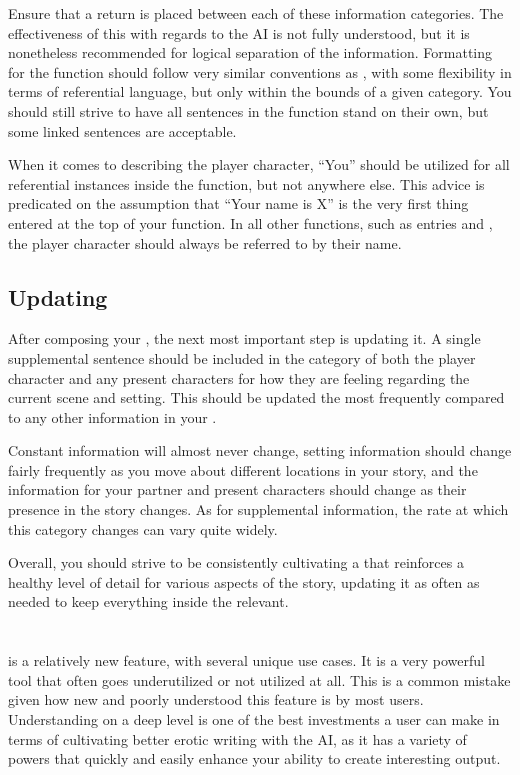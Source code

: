 \documentclass[Source-main.tex]{subfiles}
\begin{document}
Ensure that a return is placed between each of these information categories.
The effectiveness of this with regards to the AI is not fully understood, but it is nonetheless recommended for logical separation of the information.
Formatting for the \rem function should follow very similar conventions as \wi, with some flexibility in terms of referential language, but only within the bounds of a given category.
You should still strive to have all sentences in the \rem function stand on their own, but some linked sentences are acceptable.

When it comes to describing the player character, “You” should be utilized for all referential instances inside the \rem function, but not anywhere else.
This advice is predicated on the assumption that “Your name is X” is the very first thing entered at the top of your \rem function.
In all other functions, such as \wi entries and \an, the player character should always be referred to by their name.

\section{Updating}
\label{sec:updating}

After composing your \rem, the next most important step is updating it.
A single supplemental sentence should be included in the category of both the player character and any present characters for how they are feeling regarding the current scene and setting.
This should be updated the most frequently compared to any other information in your \rem.

Constant information will almost never change, setting information should change fairly frequently as you move about different locations in your story, and the information for your partner and present characters should change as their presence in the story changes.
As for supplemental information, the rate at which this category changes can vary quite widely.

Overall, you should strive to be consistently cultivating a \rem that reinforces a healthy level of detail for various aspects of the story, updating it as often as needed to keep everything inside the \rem relevant.

\chapter{\an}
\label{ch:an}

\an is a relatively new feature, with several unique use cases.
It is a very powerful tool that often goes underutilized or not utilized at all.
This is a common mistake given how new and poorly understood this feature is by most users.
Understanding \an on a deep level is one of the best investments a user can make in terms of cultivating better erotic writing with the AI, as it has a variety of powers that quickly and easily enhance your ability to create interesting output.
\end{document}
